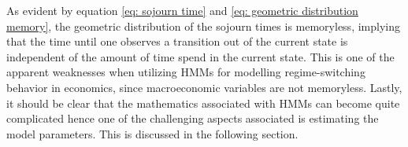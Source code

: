 As evident by equation \ref{eq: sojourn time} and \ref{eq: geometric distribution memory}, the geometric distribution of the sojourn times is memoryless, implying that the time until one observes a transition out of the current state is independent of the amount of time spend in the current state. This is one of the apparent weaknesses when utilizing HMMs for modelling regime-switching behavior in economics, since macroeconomic variables are not memoryless. Lastly, it should be clear that the mathematics associated with HMMs can become quite complicated hence one of the challenging aspects associated is estimating the model parameters. This is discussed in the following section.

